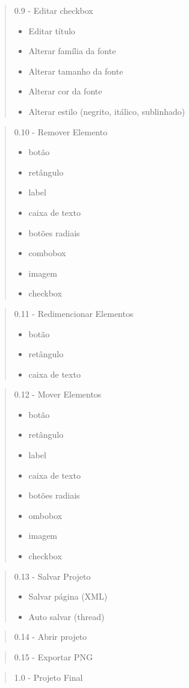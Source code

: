 \documentclass[10pt,a4paper]{article}
\begin{document}
\begin{quote}
0.9 - Editar checkbox
\begin{itemize}
\item Editar título
\item Alterar família da fonte
\item Alterar tamanho da fonte
\item Alterar cor da fonte
\item Alterar estilo (negrito, itálico, sublinhado)
\end{itemize}
\end{quote}

\begin{quote}
0.10 - Remover Elemento
\begin{itemize}
\item botão
\item retângulo
\item label
\item caixa de texto
\item botões radiais
\item combobox 
\item imagem
\item checkbox
\end{itemize}
\end{quote}
\newpage
\begin{quote}
0.11 - Redimencionar Elementos
\begin{itemize}
\item botão
\item retângulo
\item caixa de texto
\end{itemize}
\end{quote}

\begin{quote}
0.12 - Mover Elementos
\begin{itemize}
\item botão
\item retângulo
\item label
\item caixa de texto
\item botões radiais
\item ombobox 
\item imagem
\item checkbox
\end{itemize}
\end{quote}

\begin{quote}
0.13 - Salvar Projeto
\begin{itemize}
\item Salvar página (XML)
\item Auto salvar (thread)
\end{itemize}
\end{quote}

\begin{quote}
0.14 - Abrir projeto
\end{quote}

\begin{quote}
0.15 - Exportar PNG
\end{quote}

\begin{quote}
1.0 -  Projeto Final
\end{quote}
\end{document}
